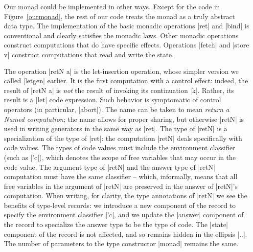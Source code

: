 \documentclass{elsart}
\begin{document}
Our monad could be implemented in other ways. Except for the code in
Figure~\ref{ourmonad}, the rest of our code treats the monad as a
truly abstract data type. The implementation of the basic monadic
operations |ret| and |bind| is conventional and clearly satisfies the
monadic laws. Other monadic operations construct computations that do
have specific effects.  Operations |fetch| and |store v| construct
computations that read and write the state.

The operation |retN a| is the let-insertion operation, whose simpler
version we called |letgen| earlier. It is the first computation with a
control effect: indeed, the result of |retN a| is \emph{not} the
result of invoking its continuation |k|. Rather, its result is a |let|
code expression. Such behavior is symptomatic of control operators (in
particular, |abort|).  The name can be taken to mean \emph{return a
  Named computation}; the name allows for proper sharing, but
otherwise |retN| is used in writing generators in the same way as
|ret|. The type of |retN| is a specialization of the type of |ret|:
the computation |retN| deals specifically with code values. The types
of code values must include the environment classifier 
(such as |'c|), which denotes
the scope of free variables that may occur in the code value. The
argument type of |retN| and the answer type of |retN| computation must
have the same classifier -- which, informally, means that all free
variables in the argument of |retN| are preserved in the answer of
|retN|'s computation. When writing, for clarity, the type annotations
of |retN| we see the benefits of type-level records: we introduce a
new component of the record to specify the environment classifier
|'c|, and we update the |answer| component of the record to specialize
the answer type to be the type of code. The |state| component of the
record is not affected, and so remains hidden in the ellipsis |..|. The
number of parameters to the type constructor |monad| remains the same.
\end{document}
